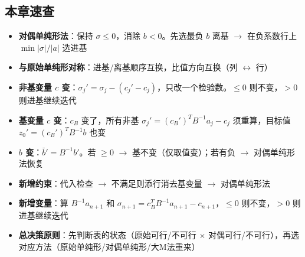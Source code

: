 \subsection{本章速查}

\begin{itemize}
  \item \textbf{对偶单纯形法}：保持 $\sigma \le 0$，消除 $b < 0$。先选最负 $b$ 离基 $\to$ 在负系数行上 $\min |\sigma|/|a|$ 选进基
  \item \textbf{与原始单纯形对称}：进基/离基顺序互换，比值方向互换（列 $\leftrightarrow$ 行）
  \item \textbf{非基变量 $c$ 变}：$\sigma_j' = \sigma_j - (c_j'-c_j)$，只改一个检验数。$\le 0$ 则不变，$>0$ 则进基继续迭代
  \item \textbf{基变量 $c$ 变}：$c_B$ 变了，所有非基 $\sigma_j' = (c_B')^T B^{-1}a_j - c_j$ 须重算，目标值 $z_0' = (c_B')^T B^{-1}b$ 也变
  \item \textbf{$b$ 变}：$\bar{b}' = B^{-1}b'$。若 $\ge 0$ $\to$ 基不变（仅取值变）；若有负 $\to$ 对偶单纯形法恢复
  \item \textbf{新增约束}：代入检查 $\to$ 不满足则添行消去基变量 $\to$ 对偶单纯形法
  \item \textbf{新增变量}：算 $B^{-1}a_{n+1}$ 和 $\sigma_{n+1} = c_B^T B^{-1}a_{n+1} - c_{n+1}$，$\le 0$ 则不变，$>0$ 则进基继续迭代
  \item \textbf{总决策原则}：先判断表的状态（原始可行/不可行 $\times$ 对偶可行/不可行），再选对应方法（原始单纯形/对偶单纯形/大M法重来）
\end{itemize}
